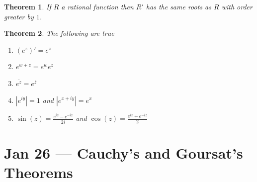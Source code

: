 \documentclass[a4paper]{article}
\newtheorem{thm}{Theorem}[section]
\begin{document}
\begin{thm}
    If $R$ a rational function then $R'$ has the same roots as $R$ with order greater by $1$. 
\end{thm}
\begin{thm}
    The following are true
    \begin{enumerate}
        \item $ \left(  e^z \right)'=e^z$
        \item $e^{w+z}=e^we^z$
        \item $\overline{e^z}=e^{\overline{z}}$
        \item $|e^{iy}|=1$ and $|e^{x+iy}|=e^x$
        \item $\sin(z)=\frac{e^{iz}-e^{-iz}}{2i}$ and $\cos(z)=\frac{e^{iz}+e^{-iz}}{2}$
    \end{enumerate}
\end{thm}
\section{Jan 26 --- Cauchy's and Goursat's Theorems}
\end{document}
